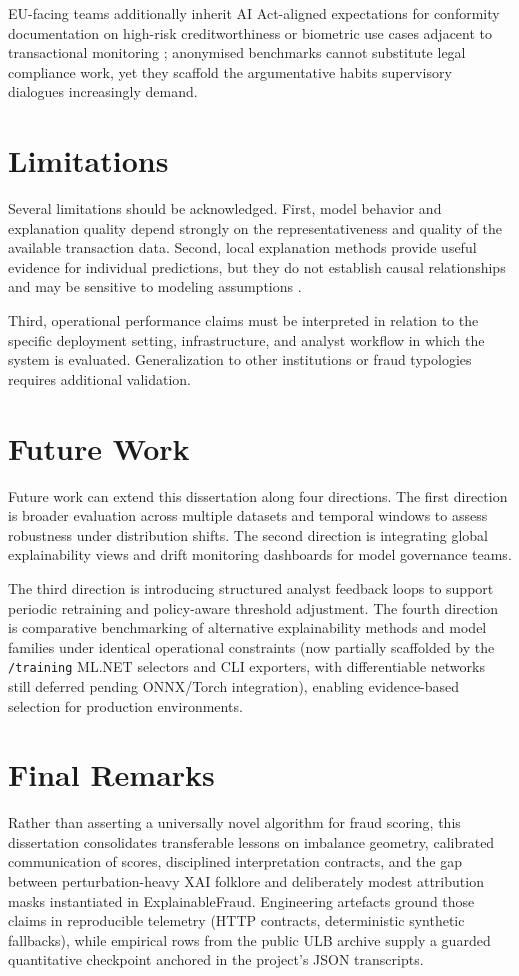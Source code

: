 EU-facing teams additionally inherit AI Act-aligned expectations for conformity documentation on high-risk creditworthiness or biometric use cases adjacent to transactional monitoring \cite{eu_ai_act2024}; anonymised benchmarks cannot substitute legal compliance work, yet they scaffold the argumentative habits supervisory dialogues increasingly demand.

\section{Limitations}
Several limitations should be acknowledged. First, model behavior and explanation quality depend strongly on the representativeness and quality of the available transaction data. Second, local explanation methods provide useful evidence for individual predictions, but they do not establish causal relationships and may be sensitive to modeling assumptions \cite{shap_original}.

Third, operational performance claims must be interpreted in relation to the specific deployment setting, infrastructure, and analyst workflow in which the system is evaluated. Generalization to other institutions or fraud typologies requires additional validation.

\section{Future Work}
Future work can extend this dissertation along four directions. The first direction is broader evaluation across multiple datasets and temporal windows to assess robustness under distribution shifts. The second direction is integrating global explainability views and drift monitoring dashboards for model governance teams.

The third direction is introducing structured analyst feedback loops to support periodic retraining and policy-aware threshold adjustment. The fourth direction is comparative benchmarking of alternative explainability methods and model families under identical operational constraints (now partially scaffolded by the \texttt{/training} ML.NET selectors and CLI exporters, with differentiable networks still deferred pending ONNX/Torch integration), enabling evidence-based selection for production environments.

\section{Final Remarks}
Rather than asserting a universally novel algorithm for fraud scoring, this dissertation consolidates transferable lessons on imbalance geometry, calibrated communication of scores, disciplined interpretation contracts, and the gap between perturbation-heavy XAI folklore and deliberately modest attribution masks instantiated in ExplainableFraud. Engineering artefacts ground those claims in reproducible telemetry (HTTP contracts, deterministic synthetic fallbacks), while empirical rows from the public ULB archive supply a guarded quantitative checkpoint anchored in the project's JSON transcripts.

